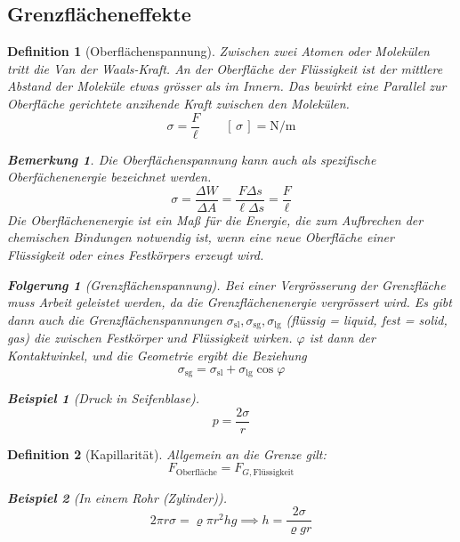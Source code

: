 \documentclass[a4paper, twocolumn]{article}
\numberwithin{equation}{section}
\theoremstyle{hsr-def}
\newtheorem{definition}{Definition}[section]
\theoremstyle{hsr-sub}
\newtheorem{result}{Folgerung}[definition]
\newtheorem{example}{Beispiel}[definition]
\theoremstyle{hsr-unnum}
\newtheorem{remark}{Bemerkung}[definition]
\newcommand{\unitsof}[1]{\ensuremath{\left[\,#1\,\right]}}
\begin{document}
\subsection{Grenzfl\"acheneffekte}

\begin{definition}[Oberfl\"achenspannung]
Zwischen zwei Atomen oder Molek\"ulen tritt die \emph{Van der Waals}-Kraft.
An der Oberfl\"ache der Fl\"ussigkeit ist der mittlere Abstand der Molek\"ule etwas gr\"osser als im Innern. Das bewirkt eine Parallel zur Oberfl\"ache gerichtete anzihende Kraft zwischen den Molek\"ulen.
\[
    \sigma = \frac{F}{\ell}
    \qquad
    \unitsof{\sigma} = \si{\newton\per\metre}
\]
\begin{remark}
Die Oberfl\"achenspannung kann auch als \emph{spezifische Oberf\"achenenergie} bezeichnet werden.
\[
    \sigma
    = \frac{\Delta W}{\Delta A} 
    = \frac{F\Delta s}{\ell \Delta s}
    = \frac{F}{\ell}
\]
Die \emph{Oberfl\"achenenergie} ist ein Ma{\ss} f\"ur die Energie, die zum Aufbrechen der chemischen Bindungen notwendig ist, wenn eine neue Oberfl\"ache einer Fl\"ussigkeit oder eines Festkörpers erzeugt wird.
\end{remark}

\begin{result}[Grenzfl\"achenspannung]
Bei einer Vergr\"osserung der Grenzfl\"ache muss Arbeit geleistet werden, da die Grenzfl\"achenenergie vergr\"ossert wird.
Es gibt dann auch die Grenzfl\"achenspannungen 
\(
    \sigma_\text{sl},
    \sigma_\text{sg},
    \sigma_\text{lg}
\) (fl\"ussig = liquid, fest = solid, gas) die zwischen Festk\"orper und Fl\"ussigkeit wirken. \(\varphi\) ist dann der \emph{Kontaktwinkel}, und die Geometrie ergibt die Beziehung
\[
    \sigma_\text{sg} = \sigma_\text{sl} + \sigma_\text{lg} \cos \varphi
\]
\end{result}

\begin{example}[Druck in Seifenblase]
\[
    p = \frac{2\sigma}{r}
\]
\end{example}
\end{definition}

\begin{definition}[Kapillarit\"at]
Allgemein an die Grenze gilt:
\[
    F_\text{Oberfl\"ache} = F_{G,\text{Fl\"ussigkeit}}
\]
\begin{example}[In einem Rohr (Zylinder)]
\[
    2\pi r\sigma = \varrho\pi r^2 hg \implies  h = \frac{2\sigma}{\varrho g r}
\]
\end{example}
\end{definition}
\end{document}
